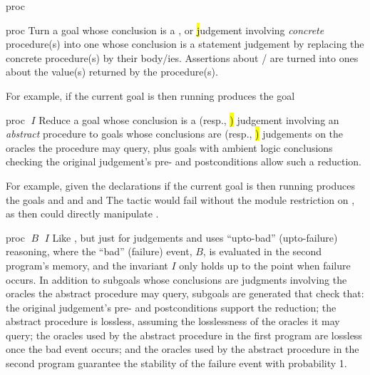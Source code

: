\begin{tactic}{proc}
  \begin{tsyntax}{proc}
    Turn a goal whose conclusion is a \prhl, \phl or \hl judgement
    involving \emph{concrete} procedure(s) into one whose conclusion
    is a statement judgement by replacing the concrete procedure(s) by
    their body/ies. Assertions about / are turned
    into ones about the value(s) returned by the procedure(s).

  \bigskip
  For example, if the current goal is
   then
  running 
  produces the goal
  \end{tsyntax}

  \begin{tsyntax}{proc $\;I$}
    Reduce a goal whose conclusion is a \prhl (resp., \hl) judgement
    involving an \emph{abstract} procedure to goals whose conclusions
    are \prhl (resp., \hl) judgements on the oracles the procedure may
    query, plus goals with ambient logic conclusions checking the
    original judgement's pre- and postconditions allow such
    a reduction.

  \bigskip
  For example, given the declarations
  if the current goal is
   then
  running 
  produces the goals
  and
  and
  and
  The tactic would fail without the module restriction  on
  , as then  could directly manipulate .
  \end{tsyntax}

  \begin{tsyntax}{proc $\;B$ $\;I$}
    Like , but just for \prhl judgements and uses
    ``upto-bad'' (upto-failure) reasoning, where the ``bad'' (failure)
    event, $B$, is evaluated in the second program's memory, and the
    invariant $I$ only holds up to the point when failure occurs.  In
    addition to subgoals whose conclusions are \prhl judgments
    involving the oracles the abstract procedure may query, subgoals
    are generated that check that: the original judgement's pre- and
    postconditions support the reduction; the abstract procedure is
    lossless, assuming the losslessness of the oracles it may query;
    the oracles used by the abstract procedure in the first program
    are lossless once the bad event occurs; and the oracles used by
    the abstract procedure in the second program guarantee the
    stability of the failure event with probability 1.


\end{tsyntax}
\end{tactic}
